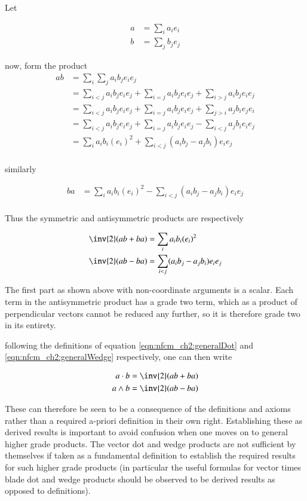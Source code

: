 Let

\begin{align*}
a &= \sum_i a_i e_i \\
b &= \sum_j b_j e_j
\end{align*}

now, form the product
\begin{align*}
a b
&= \sum_i \sum_j a_i b_j e_i e_j \\
&= 
 \sum_{i < j} a_i b_j e_i e_j 
+\sum_{i = j} a_i b_j e_i e_j 
+\sum_{i > j} a_i b_j e_i e_j \\
&= 
 \sum_{i < j} a_i b_j e_i e_j 
+\sum_{i = j} a_i b_j e_i e_j 
+\sum_{j > i} a_j b_i e_j e_i \\
&= 
 \sum_{i < j} a_i b_j e_i e_j 
+\sum_{i = j} a_i b_j e_i e_j 
-\sum_{i < j} a_j b_i e_i e_j \\
&= \sum_{i} a_i b_i (e_i)^2 
+ \sum_{i < j} (a_i b_j - a_j b_i) e_i e_j  \\
\end{align*}

similarly

\begin{align*}
b a &= \sum_{i} a_i b_i (e_i)^2 - \sum_{i < j} (a_i b_j - a_j b_i) e_i e_j  \\
\end{align*}

Thus the symmetric and antisymmetric products are respectively

\begin{align*}
\inv{2}(a b + b a) &= \sum_{i} a_i b_i (e_i)^2 \\
\inv{2}(a b - b a) &= \sum_{i < j} (a_i b_j - a_j b_i) e_i e_j  \\
\end{align*}

The first part as shown above with non-coordinate arguments is a scalar.  Each term in the antisymmetric product has a grade two term, which
as a product of perpendicular vectors cannot be reduced any further, so it is therefore grade two in its entirety.

following the definitions of equation \ref{eqn:nfcm_ch2:generalDot} and \ref{eqn:nfcm_ch2:generalWedge} respectively, one can then write

\begin{align}
a \cdot b &= \inv{2}(a b + b a) \\
a \wedge b &= \inv{2}(a b - b a)
\end{align}

These can therefore be seen to be a consequence of the definitions and axioms rather than a required a-priori definition in their own right.  Establishing
these as derived results is important to avoid confusion when one moves on to general higher grade products.  The vector dot and wedge products are
not sufficient by themselves if taken as a fundamental definition to establish the required results for such higher grade products (in particular the useful
formulas for vector times blade dot and wedge products should be observed to be derived results as opposed to definitions).

